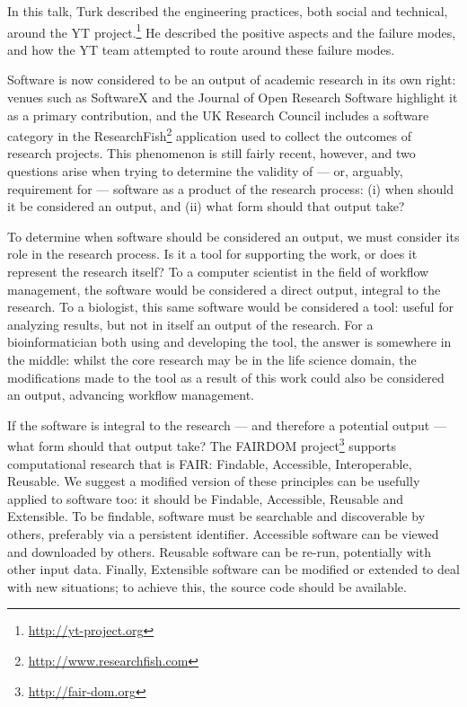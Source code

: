 \documentclass[a4paper,UKenglish]{dagrep}
\begin{document}

In this talk, Turk described the engineering practices, both social and
technical, around the YT project.\footnote{\url{http://yt-project.org}}  
He described the positive aspects and the failure modes, and how the YT team attempted to
route around these failure modes.


Software is now considered to be an output of academic research in its own right: venues such as SoftwareX and the Journal of Open Research Software highlight it as a primary contribution, and the UK Research Council includes a software category in the ResearchFish\footnote{\url{http://www.researchfish.com}} application used to collect the outcomes of research projects. This phenomenon is still fairly recent, however, and two questions arise when trying to determine the validity of --- or, arguably, requirement for --- software as a product of the research process: (i) when should it be considered an output, and (ii) what form should that output take?

To determine when software should be considered an output, we must consider its role in the research process. Is it a tool for supporting the work, or does it represent the research itself? To a computer scientist in the field of workflow management, the software would be considered a direct output, integral to the research. To a biologist, this same software would be considered a tool: useful for analyzing results, but not in itself an output of the research. For a bioinformatician both using and developing the tool, the answer is somewhere in the middle: whilst the core research may be in the life science domain, the modifications made to the tool as a result of this work could also be considered an output, advancing workflow management.

If the software is integral to the research --- and therefore a potential output --- what form should that output take? The FAIRDOM project\footnote{\url{http://fair-dom.org}} supports computational research that is FAIR: Findable, Accessible, Interoperable, Reusable. We suggest a modified version of these principles can be usefully applied to software too: it should be Findable, Accessible, Reusable and Extensible. To be findable, software must be searchable and discoverable by others, preferably via a persistent identifier. Accessible software can be viewed and downloaded by others. Reusable software can be re-run, potentially with other input data. Finally, Extensible software can be modified or extended to deal with new situations; to achieve this, the source code should be available.
\end{document}

